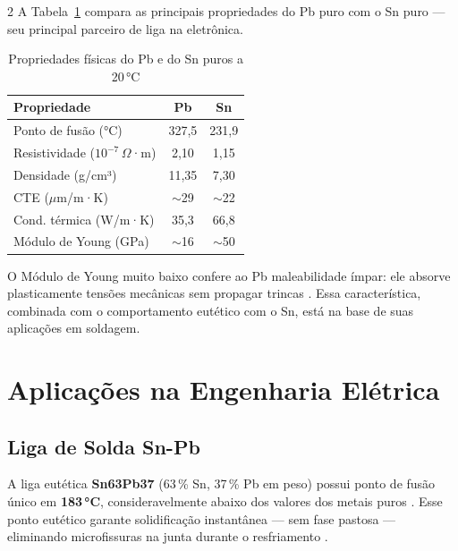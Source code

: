 \documentclass[12pt]{article}
\begin{document}
\begin{multicols}{2}
A Tabela~\ref{tab:propriedades} compara as principais propriedades do Pb puro com o
Sn puro — seu principal parceiro de liga na eletrônica.

\begin{table}[H]
\centering
\caption{Propriedades físicas do Pb e do Sn puros a 20\,°C}
\label{tab:propriedades}
\footnotesize
\begin{tabular}{lcc}
\toprule
\textbf{Propriedade} & \textbf{Pb} & \textbf{Sn} \\
\midrule
Ponto de fusão (°C)               & 327,5  & 231,9  \\
Resistividade ($10^{-7}$\,\(\Omega\)·m) & 2,10   & 1,15   \\
Densidade (g/cm³)                 & 11,35  & 7,30   \\
CTE ($\mu$m/m·K)                  & \(\sim\)29 & \(\sim\)22 \\
Cond. térmica (W/m·K)             & 35,3   & 66,8   \\
Módulo de Young (GPa)             & \(\sim\)16 & \(\sim\)50 \\
\bottomrule
\end{tabular}
\end{table}

O Módulo de Young muito baixo confere ao Pb maleabilidade ímpar: ele absorve
plasticamente tensões mecânicas sem propagar trincas \cite{ref_intel_pkg}. Essa
característica, combinada com o comportamento eutético com o Sn, está na base de suas
aplicações em soldagem.

\section{Aplicações na Engenharia Elétrica}

\subsection{Liga de Solda Sn-Pb}

A liga eutética \textbf{Sn63Pb37} (63\,\% Sn, 37\,\% Pb em peso) possui ponto de fusão
único em \textbf{183\,°C}, consideravelmente abaixo dos valores dos metais puros
\cite{ref_solder_wiki}. Esse ponto eutético garante solidificação instantânea — sem fase
pastosa — eliminando microfissuras na junta durante o resfriamento \cite{ref_aimsolder}.


\end{multicols}
\end{document}
